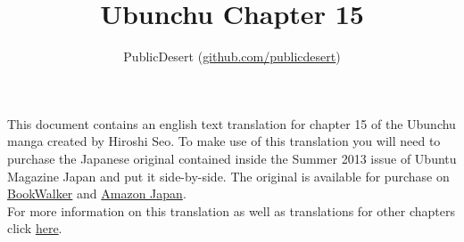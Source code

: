 \documentclass[12pt]{article}
\title{Ubunchu Chapter 15}
\author{PublicDesert (\href{https://github.com/publicdesert}{github.com/publicdesert})}
\date{}
\begin{document}
\maketitle
\thispagestyle{empty}

This document contains an english text translation for chapter 15 of the Ubunchu manga created by Hiroshi Seo. To make use of this translation you will need to purchase the Japanese original contained inside the Summer 2013 issue of Ubuntu Magazine Japan and put it side-by-side. The original is available for purchase on \href{https://bookwalker.jp/de25473cc5-4d0a-4223-88f8-2a2ac86e0182/}{BookWalker} and \href{https://www.amazon.co.jp/-/en/dp/B00D8R85MC}{Amazon Japan}.\\

For more information on this translation as well as translations for other chapters click \href{https://github.com/publicdesert/ubunchu_english}{here}.
\end{document}
